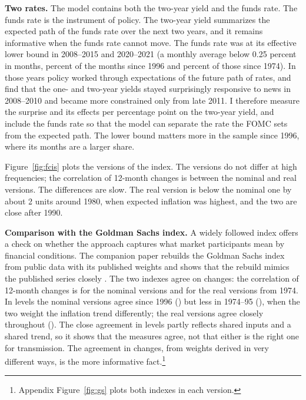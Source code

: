 \documentclass[11pt]{article}
\begin{document}
\textbf{Two rates.} The model contains both the two-year yield and the funds rate. The funds rate is the instrument of policy. The two-year yield summarizes the expected path of the funds rate over the next two years, and it remains informative when the funds rate cannot move. The funds rate was at its effective lower bound in 2008--2015 and 2020--2021 (a monthly average below 0.25 percent in  months,  percent of the months since 1996 and  percent of those since 1974). In those years policy worked through expectations of the future path of rates, and \citet{swanson2014} find that the one- and two-year yields stayed surprisingly responsive to news in 2008--2010 and became more constrained only from late 2011. I therefore measure the surprise and its effects per percentage point on the two-year yield, and include the funds rate so that the model can separate the rate the FOMC sets from the expected path. The lower bound matters more in the sample since 1996, where its months are a larger share.

Figure~\ref{fig:fcis} plots the versions of the index. The versions do not differ at high frequencies; the correlation of 12-month changes is  between the nominal and real versions. The differences are slow. The real version is below the nominal one by about 2 units around 1980, when expected inflation was highest, and the two are close after 1990.

\textbf{Comparison with the Goldman Sachs index.} A widely followed index offers a check on whether the approach captures what market participants mean by financial conditions. The companion paper rebuilds the Goldman Sachs index from public data with its published weights and shows that the rebuild mimics the published series closely \citep{fcinote}. The two indexes agree on changes: the correlation of 12-month changes is  for the nominal versions and  for the real versions from 1974. In levels the nominal versions agree since 1996 () but less in 1974--95 (), when the two weight the inflation trend differently; the real versions agree closely throughout (). The close agreement in levels partly reflects shared inputs and a shared trend, so it shows that the measures agree, not that either is the right one for transmission. The agreement in changes, from weights derived in very different ways, is the more informative fact.\footnote{Appendix Figure~\ref{fig:gs} plots both indexes in each version.}
\end{document}
